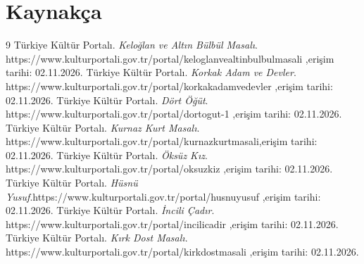 \documentclass[12pt,a4paper]{article}
\begin{document}
\section{Kaynakça}

\begin{thebibliography}{9}
 Türkiye Kültür Portalı. \emph{Keloğlan ve Altın Bülbül Masalı}. https://www.kulturportali.gov.tr/portal/keloglanvealtinbulbulmasali ,erişim tarihi: 02.11.2026.
 Türkiye Kültür Portalı. \emph{Korkak Adam ve Devler}. https://www.kulturportali.gov.tr/portal/korkakadamvedevler ,erişim tarihi: 02.11.2026.
 Türkiye Kültür Portalı. \emph{Dört Öğüt}. https://www.kulturportali.gov.tr/portal/dortogut-1 ,erişim tarihi: 02.11.2026.
 Türkiye Kültür Portalı. \emph{Kurnaz Kurt Masalı}. https://www.kulturportali.gov.tr/portal/kurnazkurtmasali,erişim tarihi: 02.11.2026.
 Türkiye Kültür Portalı. \emph{Öksüz Kız}. https://www.kulturportali.gov.tr/portal/oksuzkiz ,erişim tarihi: 02.11.2026.
 Türkiye Kültür Portalı. \emph{Hüsnü Yusuf}.https://www.kulturportali.gov.tr/portal/husnuyusuf ,erişim tarihi: 02.11.2026.
 Türkiye Kültür Portalı. \emph{İncili Çadır}. https://www.kulturportali.gov.tr/portal/incilicadir ,erişim tarihi: 02.11.2026.
 Türkiye Kültür Portalı. \emph{Kırk Dost Masalı}. https://www.kulturportali.gov.tr/portal/kirkdostmasali ,erişim tarihi: 02.11.2026.
\end{thebibliography}

\appendix
\end{document}

